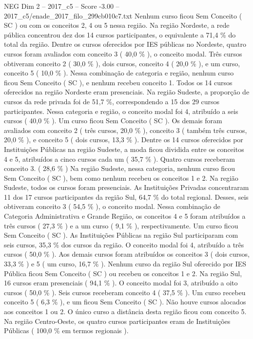 \begin{textsample}{NEG Dim 2 – 2017\_c5 – Score -3.00 – 2017\_c5/enade\_2017\_filo\_299cb010c7.txt}
Nenhum curso ficou Sem Conceito ( SC ) ou com os conceitos 2, 4 ou 5 nessa região.
Na região Nordeste, a rede pública concentrou dez dos 14 cursos participantes, o equivalente a 71,4 \% do total da região.
Dentre os cursos oferecidos por IES públicas no Nordeste, quatro cursos foram avaliados com conceito 3 ( 40,0 \% ), o conceito modal.
Três cursos obtiveram conceito 2 ( 30,0 \% ), dois cursos, conceito 4 ( 20,0 \% ), e um curso, conceito 5 ( 10,0 \% ).
Nessa combinação de categoria e região, nenhum curso ficou Sem Conceito ( SC ), e nenhum recebeu conceito 1.
Todos os 14 cursos oferecidos na região Nordeste eram presenciais.
Na região Sudeste, a proporção de cursos da rede privada foi de 51,7 \%, correspondendo a 15 dos 29 cursos participantes.
Nessa categoria e região, o conceito modal foi 4, atribuído a seis cursos ( 40,0 \% ).
Um curso ficou Sem Conceito ( SC ).
Os demais foram avaliados com conceito 2 ( três cursos, 20,0 \% ), conceito 3 ( também três cursos, 20,0 \% ), e conceito 5 ( dois cursos, 13,3 \% ).
Dentre os 14 cursos oferecidos por Instituições Públicas na região Sudeste, a moda ficou dividida entre os conceitos 4 e 5, atribuídos a cinco cursos cada um ( 35,7 \% ).
Quatro cursos receberam conceito 3. ( 28,6 \% ) Na região Sudeste, nessa categoria, nenhum curso ficou Sem Conceito ( SC ), bem como nenhum recebeu os conceitos 1 e 2.
Na região Sudeste, todos os cursos foram presenciais.
As Instituições Privadas concentraram 11 dos 17 cursos participantes da região Sul, 64,7 \% do total regional.
Desses, seis obtiveram conceito 3 ( 54,5 \% ), o conceito modal.
Nessa combinação de Categoria Administrativa e Grande Região, os conceitos 4 e 5 foram atribuídos a três cursos ( 27,3 \% ) e a um curso ( 9,1 \% ), respectivamente.
Um curso ficou Sem Conceito ( SC ).
As Instituições Públicas na região Sul participaram com seis cursos, 35,3 \% dos cursos da região.
O conceito modal foi 4, atribuído a três cursos ( 50,0 \% ).
Aos demais cursos foram atribuídos os conceitos 3 ( dois cursos, 33,3 \% ) e 5 ( um curso, 16,7 \% ).
Nenhum curso da região Sul oferecido por IES Pública ficou Sem Conceito ( SC ) ou recebeu os conceitos 1 e 2.
Na região Sul, 16 cursos eram presenciais ( 94,1 \% ).
O conceito modal foi 3, atribuído a oito cursos ( 50,0 \% ).
Seis cursos receberam conceito 4 ( 37,5 \% ).
Um curso recebeu conceito 5 ( 6,3 \% ), e um ficou Sem Conceito ( SC ).
Não houve cursos alocados aos conceitos 1 ou 2.
O único curso a distância desta região ficou com conceito 5.
Na região Centro-Oeste, os quatro cursos participantes eram de Instituições Públicas ( 100,0 \% em termos regionais ).

\end{textsample}

